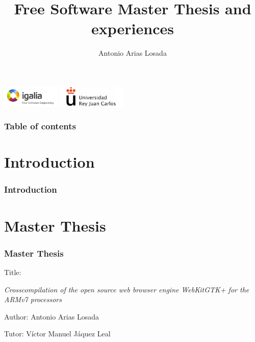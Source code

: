 \documentclass[slidestop,compress,mathserif]{beamer}
\title[Master Thesis and experiences]
{Free Software Master Thesis and experiences}
\author[Autores abreviados]{Antonio Arias Losada}
\institute{Free Software Master - 2011/2012}
\begin{document}
\begin{frame}
  \titlepage
  \begin{center}
    \includegraphics[height=1cm]{images/igalia.png}
    \hspace{10mm}
    \includegraphics[height=1cm]{images/urjc.png}
  \end{center}
\end{frame}

\begin{frame}
  \frametitle{Table of contents}

  \tableofcontents[hideallsubsections]
\end{frame}


\section{Introduction}
\begin{frame}
  \frametitle{Introduction}

\end{frame}

\section{Master Thesis}
\begin{frame}
  \frametitle{Master Thesis}

  Title:
  \begin{center}
    \textit{Crosscompilation of the open source web browser engine WebKitGTK+ for the ARMv7 processors}
  \end{center}

  Author:
  Antonio Arias Losada

  Tutor:
  V\'ictor Manuel J\'aquez Leal

\end{frame}
\end{document}
